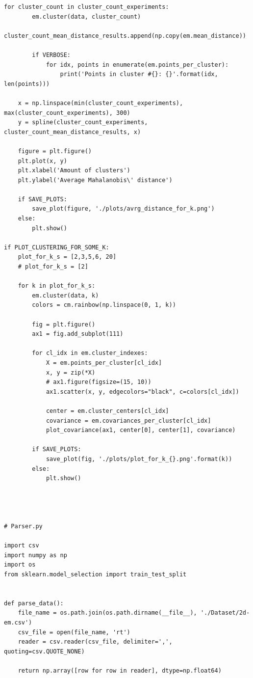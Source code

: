 \begin{lstlisting}[style=py]
    for cluster_count in cluster_count_experiments:
        em.cluster(data, cluster_count)
        cluster_count_mean_distance_results.append(np.copy(em.mean_distance))

        if VERBOSE:
            for idx, points in enumerate(em.points_per_cluster):
                print('Points in cluster #{}: {}'.format(idx, len(points)))

    x = np.linspace(min(cluster_count_experiments), max(cluster_count_experiments), 300)
    y = spline(cluster_count_experiments, cluster_count_mean_distance_results, x)

    figure = plt.figure()
    plt.plot(x, y)
    plt.xlabel('Amount of clusters')
    plt.ylabel('Average Mahalanobis\' distance')

    if SAVE_PLOTS:
        save_plot(figure, './plots/avrg_distance_for_k.png')
    else:
        plt.show()

if PLOT_CLUSTERING_FOR_SOME_K:
    plot_for_k_s = [2,3,5,6, 20]
    # plot_for_k_s = [2]

    for k in plot_for_k_s:
        em.cluster(data, k)
        colors = cm.rainbow(np.linspace(0, 1, k))

        fig = plt.figure()
        ax1 = fig.add_subplot(111)

        for cl_idx in em.cluster_indexes:
            X = em.points_per_cluster[cl_idx]
            x, y = zip(*X)
            # ax1.figure(figsize=(15, 10))
            ax1.scatter(x, y, edgecolors="black", c=colors[cl_idx])

            center = em.cluster_centers[cl_idx]
            covariance = em.covariances_per_cluster[cl_idx]
            plot_covariance(ax1, center[0], center[1], covariance)

        if SAVE_PLOTS:
            save_plot(fig, './plots/plot_for_k_{}.png'.format(k))
        else:
            plt.show()




# Parser.py

import csv
import numpy as np
import os
from sklearn.model_selection import train_test_split


def parse_data():
    file_name = os.path.join(os.path.dirname(__file__), './Dataset/2d-em.csv')
    csv_file = open(file_name, 'rt')
    reader = csv.reader(csv_file, delimiter=',', quoting=csv.QUOTE_NONE)

    return np.array([row for row in reader], dtype=np.float64)






\end{lstlisting}

